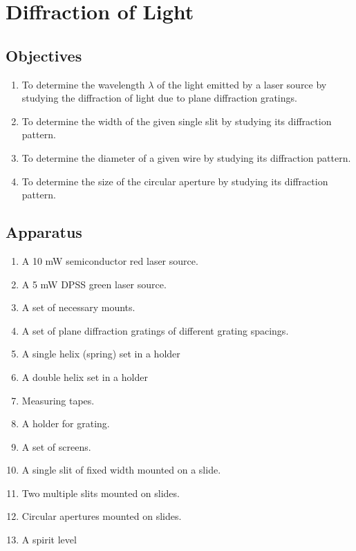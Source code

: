 
\chapter{Diffraction of Light}

\section*{Objectives}

\begin{enumerate}
    \item To determine the wavelength $\lambda$ of the light emitted by a laser source by studying the diffraction of light due to plane diffraction gratings.
    \item To determine the width of the given single slit by studying its diffraction pattern.
    \item To determine the diameter of a given wire by studying its diffraction pattern.
    \item To determine the size of the circular aperture by studying its diffraction pattern.
\end{enumerate}



\section*{Apparatus}

\begin{enumerate}
    \item A 10 mW semiconductor red laser source.
    \item A 5 mW DPSS green laser source.
    \item A set of necessary mounts.
    \item A set of plane diffraction gratings of different grating spacings.
    \item A single helix (spring) set in a holder
    \item A double helix set in a holder
    \item Measuring tapes.
    \item A holder for grating.
    \item A set of screens.  
    \item A single slit of fixed width mounted on a slide.
    \item Two multiple slits mounted on slides.
    \item Circular apertures mounted on slides.
    \item A spirit level
\end{enumerate}

